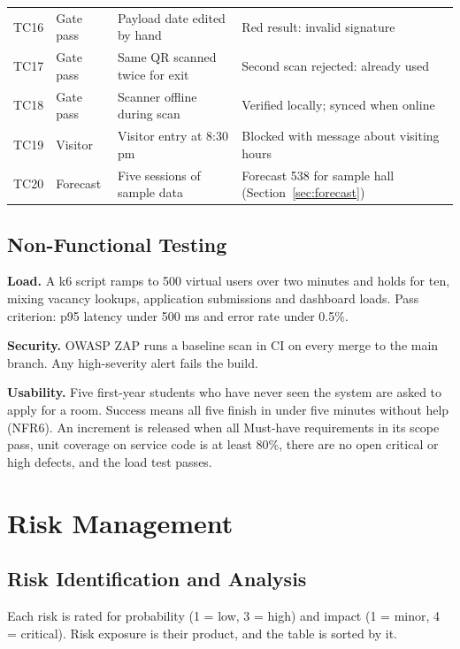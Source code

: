 \documentclass[11pt,a4paper]{report}
\begin{document}
\begin{longtable}{p{0.9cm}p{2.1cm}p{5.6cm}p{5.6cm}}
TC16 & Gate pass & Payload date edited by hand & Red result: invalid signature\\
TC17 & Gate pass & Same QR scanned twice for exit & Second scan rejected: already used\\
TC18 & Gate pass & Scanner offline during scan & Verified locally; synced when online\\
TC19 & Visitor & Visitor entry at 8:30 pm & Blocked with message about visiting hours\\
TC20 & Forecast & Five sessions of sample data & Forecast 538 for sample hall (Section~\ref{sec:forecast})\\
\bottomrule
\end{longtable}

\section{Non-Functional Testing}
\textbf{Load.} A k6 script ramps to 500 virtual users over two minutes and holds for ten, mixing vacancy lookups, application submissions and dashboard loads. Pass criterion: p95 latency under 500 ms and error rate under 0.5\%.

\textbf{Security.} OWASP ZAP runs a baseline scan in CI on every merge to the main branch. Any high-severity alert fails the build.

\textbf{Usability.} Five first-year students who have never seen the system are asked to apply for a room. Success means all five finish in under five minutes without help (NFR6). An increment is released when all Must-have requirements in its scope pass, unit coverage on service code is at least 80\%, there are no open critical or high defects, and the load test passes.
\chapter{Risk Management}

\section{Risk Identification and Analysis}
Each risk is rated for probability (1 = low, 3 = high) and impact (1 = minor, 4 = critical). Risk exposure is their product, and the table is sorted by it.
\end{document}
